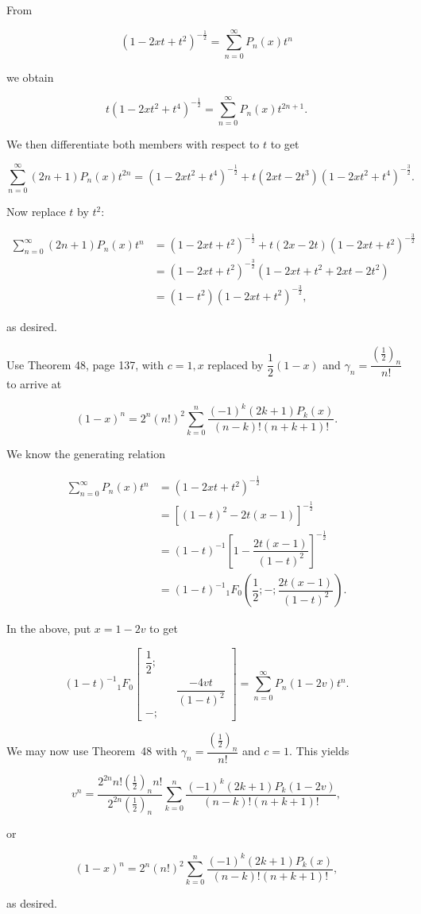 \begin{solution}
From

$$(1-2xt+t^2)^{-\frac{1}{2}} = \displaystyle\sum_{n=0}^{\infty} P_n(x) t^n$$

we obtain

$$t(1-2xt^2+t^4)^{-\frac{1}{2}} = \displaystyle\sum_{n=0}^{\infty} P_n(x) t^{2n+1}.$$

We then differentiate both members with respect to $t$ to get

$$\displaystyle\sum_{n=0}^{\infty} (2n+1)P_n(x) t^{2n} = (1-2xt^2+t^4)^{-\frac{1}{2}} + t(2xt-2t^3)(1-2xt^2+t^4)^{-\frac{3}{2}}.$$

Now replace $t$ by $t^2$:

$$\begin{array}{ll}
\displaystyle\sum_{n=0}^{\infty} (2n+1)P_n(x)t^n &= (1-2xt+t^2)^{-\frac{1}{2}} + t(2x-2t)(1-2xt+t^2)^{-\frac{3}{2}} \\
&= (1-2xt+t^2)^{-\frac{3}{2}} (1-2xt+t^2 +2xt-2t^2) \\
&= (1-t^2)(1-2xt+t^2)^{-\frac{3}{2}},
\end{array}$$

as desired.
\end{solution}
\begin{problem}\label{problem17chapter10}
Use Theorem 48, page 137, with $c=1, x$ replaced by $\dfrac{1}{2} (1-x)$ and $\gamma_n = \dfrac{(\frac{1}{2})_n}{n!}$ to arrive at

$$(1-x)^n = 2^n (n!)^2 \displaystyle\sum_{k=0}^n \dfrac{(-1)^k (2k+1) P_k(x)}{(n-k)! (n+k+1)!}.$$
\end{problem}
\begin{solution}
We know the generating relation

$$\begin{array}{ll}
\displaystyle\sum_{n=0}^{\infty} P_n(x) t^n &= (1-2xt+t^2)^{-\frac{1}{2}} \\
&= [(1-t)^2 - 2t(x-1)]^{-\frac{1}{2}} \\
&= (1-t)^{-1} \left[ 1 - \dfrac{2t(x-1)}{(1-t)^2} \right]^{-\frac{1}{2}} \\
&= (1-t)^{-1} {}_1F_0 \left( \dfrac{1}{2}; - ; \dfrac{2t(x-1)}{(1-t)^2} \right).
\end{array}$$

In the above, put $x=1-2v$ to get

$$(1-t)^{-1} {}_1F_0 \left[ \begin{array}{rlr}
\dfrac{1}{2}; & & \\
& & \dfrac{-4vt}{(1-t)^2} \\
-; & &
\end{array} \right] = \displaystyle\sum_{n=0}^{\infty} P_n(1-2v)t^n.$$

We may now use Theorem~48 with $\gamma_n = \dfrac{(\frac{1}{2})_n}{n!}$ and $c=1$. This yields

$$v^n = \dfrac{2^{2n}n! (\frac{1}{2})_n n!}{2^{2n} (\frac{1}{2})_n} \displaystyle\sum_{k=0}^n \dfrac{(-1)^k (2k+1)P_k(1-2v)}{(n-k)! (n+k+1)!},$$

or

$$(1-x)^n = 2^n (n!)^2 \displaystyle\sum_{k=0}^n \dfrac{(-1)^k (2k+1) P_k(x)}{(n-k)! (n+k+1)!},$$

as desired.
\end{solution}
